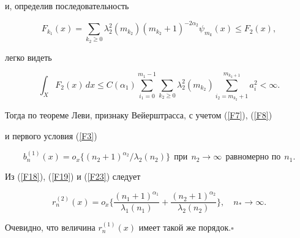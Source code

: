 и, определив последовательность


$$


F_{k_1}(x)=\sum_{k_2\ge 0} \lambda_2^2(m_{k_2})(m_{k_2}+1)^{-2\alpha_2}


\psi_{m_{k}}(x) \le F_2(x),


$$


легко видеть


$$


\int_X F_2(x)\,dx \le C(\alpha_1) \sum_{i_1=0}^{m_1-1} \sum_{k_2 \ge 0 }


\lambda_2^2(m_{k_2}) \sum_{i_2=m_{k_2}+1}^{m_{k_2+1}} a_i^2 <\infty .


$$


Тогда по теореме Леви, признаку Вейерштрасса, с учетом (\ref{F7}), (\ref{F8})


и первого условия (\ref{F3})


\begin{equation}


\label{F23}


b_n^{(1)}(x)=o_x\{ (n_2+1)^{\alpha_2}/\lambda_2(n_2) \}


\ \ \text{при} \ \ n_2 \to \infty \ \ \text{равномерно по} \ \ n_1.


\end{equation}


Из (\ref{F18}), (\ref{F19}) и (\ref{F23}) следует


$$




r_n^{(2)}(x)=o_x \bigg\{ \frac{(n_1+1)^{\alpha_1}}


{\lambda_1(n_1)}+\frac{(n_2+1)^{\alpha_2 }}{\lambda_2(n_2)} \bigg\},


\quad n_*\to \infty.




$$





Очевидно, что величина $r_n^{(1)}(x)$ имеет такой же порядок.\quad$\square$








